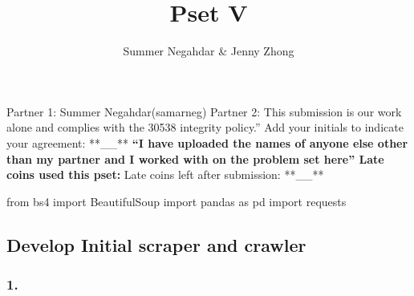 \documentclass[
  letterpaper,
  DIV=11,
  numbers=noendperiod]{scrartcl}
\title{Pset V}
\author{Summer Negahdar \& Jenny Zhong}
\date{}
\newenvironment{Shaded}{\begin{snugshade}}{\end{snugshade}}
\newcommand{\ImportTok}[1]{\textcolor[rgb]{0.00,0.46,0.62}{#1}}
\newcommand{\NormalTok}[1]{\textcolor[rgb]{0.00,0.23,0.31}{#1}}
\begin{document}
\maketitle



Partner 1: Summer Negahdar(samarneg) Partner 2: This submission is our
work alone and complies with the 30538 integrity policy.'' Add your
initials to indicate your agreement: **\_\_** \textbf{\textbf{\textbf{
``I have uploaded the names of anyone else other than my partner and I
worked with on the problem set here'' Late coins used this pset: }}}
Late coins left after submission: **\_\_**

\begin{Shaded}
\begin{Highlighting}[]
\ImportTok{from}\NormalTok{ bs4 }\ImportTok{import}\NormalTok{ BeautifulSoup}
\ImportTok{import}\NormalTok{ pandas }\ImportTok{as}\NormalTok{ pd}
\ImportTok{import}\NormalTok{ requests}
\end{Highlighting}
\end{Shaded}

\subsection{Develop Initial scraper and
crawler}\label{develop-initial-scraper-and-crawler}

\subsubsection{1.}\label{section}
\end{document}
